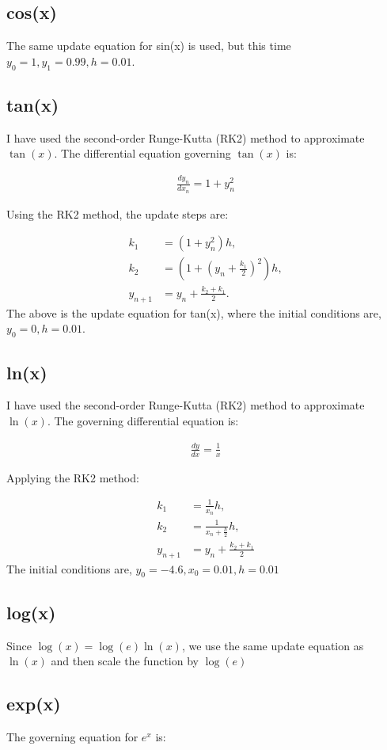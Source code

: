 \documentclass[journal]{IEEEtran}
\begin{document}
\subsection{cos(x)}
 The same update equation for sin(x) is used, but this time $y_0 = 1, y_1 = 0.99, h= 0.01$.
\subsection{tan(x)}
I have used the second-order Runge-Kutta (RK2) method to approximate \(\tan(x)\). The differential equation governing \(\tan(x)\) is:

\begin{align}
	\frac{dy_n}{dx_n} = 1 + y_n^2
\end{align}

Using the RK2 method, the update steps are:

\begin{align}
	k_1 &= (1 + y_n^2) h, \\
	k_2 &= \left(1 + \left(y_n + \frac{k_1}{2} \right)^2 \right) h, \\
	y_{n+1} &= y_n + \frac{k_2 + k_1}{2}.
\end{align}
The above is the update equation for tan(x), where the initial conditions are, $y_0 =0, h = 0.01$.
\subsection{ln(x)}
I have used the second-order Runge-Kutta (RK2) method to approximate \(\ln(x)\). The governing differential equation is:

\begin{align}
	\frac{dy}{dx} = \frac{1}{x}
\end{align}

Applying the RK2 method:

\begin{align}
	k_1 &= \frac{1}{x_n}h,  \\
	k_2 &= \frac{1}{x_n + \frac{h}{2}} h, \\
	y_{n+1} &= y_n + \frac{k_2+k_1}{2}
\end{align}
The initial conditions are, $y_0 = -4.6, x_0 = 0.01, h = 0.01$
\subsection{log(x)}
Since \(\log(x) = \log(e)\ln(x)\), we use the same update equation as \(\ln(x)\) and then scale the function by $\log(e)$
\subsection{exp(x)}
The governing equation for \(e^x\) is:
\end{document}
